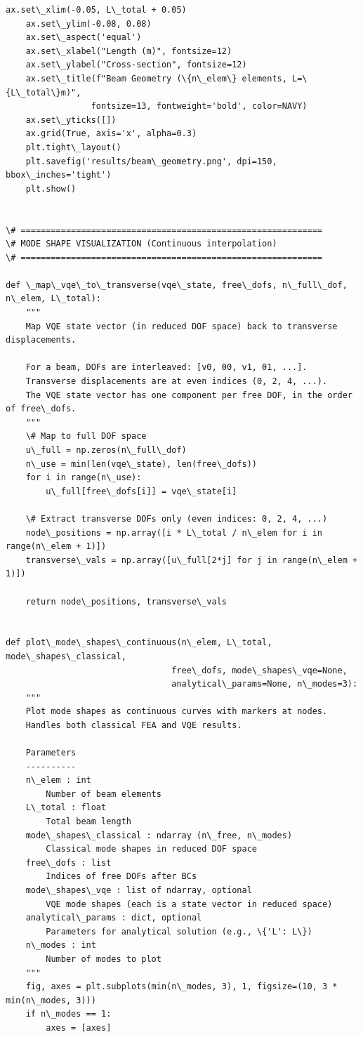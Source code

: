 \documentclass[12pt, a4paper]{article}
\begin{document}
\begin{lstlisting}[style=codestyle, caption={{visualize.py --- Beam and Truss Visualizations}}]
    ax.set\_xlim(-0.05, L\_total + 0.05)
    ax.set\_ylim(-0.08, 0.08)
    ax.set\_aspect('equal')
    ax.set\_xlabel("Length (m)", fontsize=12)
    ax.set\_ylabel("Cross-section", fontsize=12)
    ax.set\_title(f"Beam Geometry (\{n\_elem\} elements, L=\{L\_total\}m)",
                 fontsize=13, fontweight='bold', color=NAVY)
    ax.set\_yticks([])
    ax.grid(True, axis='x', alpha=0.3)
    plt.tight\_layout()
    plt.savefig('results/beam\_geometry.png', dpi=150, bbox\_inches='tight')
    plt.show()


\# ============================================================
\# MODE SHAPE VISUALIZATION (Continuous interpolation)
\# ============================================================

def \_map\_vqe\_to\_transverse(vqe\_state, free\_dofs, n\_full\_dof, n\_elem, L\_total):
    """
    Map VQE state vector (in reduced DOF space) back to transverse displacements.

    For a beam, DOFs are interleaved: [v0, θ0, v1, θ1, ...].
    Transverse displacements are at even indices (0, 2, 4, ...).
    The VQE state vector has one component per free DOF, in the order of free\_dofs.
    """
    \# Map to full DOF space
    u\_full = np.zeros(n\_full\_dof)
    n\_use = min(len(vqe\_state), len(free\_dofs))
    for i in range(n\_use):
        u\_full[free\_dofs[i]] = vqe\_state[i]

    \# Extract transverse DOFs only (even indices: 0, 2, 4, ...)
    node\_positions = np.array([i * L\_total / n\_elem for i in range(n\_elem + 1)])
    transverse\_vals = np.array([u\_full[2*j] for j in range(n\_elem + 1)])

    return node\_positions, transverse\_vals


def plot\_mode\_shapes\_continuous(n\_elem, L\_total, mode\_shapes\_classical,
                                 free\_dofs, mode\_shapes\_vqe=None,
                                 analytical\_params=None, n\_modes=3):
    """
    Plot mode shapes as continuous curves with markers at nodes.
    Handles both classical FEA and VQE results.

    Parameters
    ----------
    n\_elem : int
        Number of beam elements
    L\_total : float
        Total beam length
    mode\_shapes\_classical : ndarray (n\_free, n\_modes)
        Classical mode shapes in reduced DOF space
    free\_dofs : list
        Indices of free DOFs after BCs
    mode\_shapes\_vqe : list of ndarray, optional
        VQE mode shapes (each is a state vector in reduced space)
    analytical\_params : dict, optional
        Parameters for analytical solution (e.g., \{'L': L\})
    n\_modes : int
        Number of modes to plot
    """
    fig, axes = plt.subplots(min(n\_modes, 3), 1, figsize=(10, 3 * min(n\_modes, 3)))
    if n\_modes == 1:
        axes = [axes]


\end{lstlisting}
\end{document}
